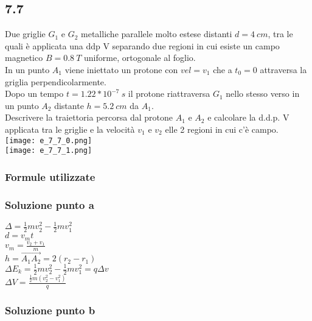 \documentclass[../../main.tex]{subfiles}
\begin{document}
\subsection*{7.7}
Due griglie $G_1$ e $G_2$ metalliche parallele molto estese distanti $d = 4\ cm$, tra le quali è applicata una ddp V separando due regioni in cui esiste un campo magnetico $B=0.8\ T$ uniforme, ortogonale al foglio.\\In un punto $A_1$ viene iniettato un protone con $vel = v_1$ che a $t_0 = 0$ attraversa la griglia perpendicolarmente.
\\Dopo un tempo $t = 1.22 *10^{-7}\ s$ il protone riattraversa $G_1$ nello stesso verso in un punto $A_2$ distante $h=5.2\ cm$ da $A_1$.
\\Descrivere la traiettoria percorsa dal protone $A_1$ e $A_2$ e calcolare la d.d.p. V applicata tra le griglie e la velocità $v_1$ e $v_2$ elle 2 regioni in cui c'è campo.
\\\texttt{[image: e\_7\_7\_0.png]}
\\\texttt{[image: e\_7\_7\_1.png]}
\subsubsection*{Formule utilizzate}
\subsubsection*{Soluzione punto a}
$\Delta = \frac{1}{2}mv_2^2 - \frac{1}{2}mv_1^2$
\\$d=v_mt$
\\$v_m=\frac{v_2+v_1}{m}$
\\$h = \vec{A_1A_2} = 2(r_2-r_1)$
\\$\Delta E_k = \frac{1}{2}mv_2^2-\frac{1}{2}mv_1^2=q\Delta v$
\\$\Delta V= \frac{\frac{1}{2}m(v_2^2-v_1^2)}{q}$
\subsubsection*{Soluzione punto b}
\newpage
\end{document}
